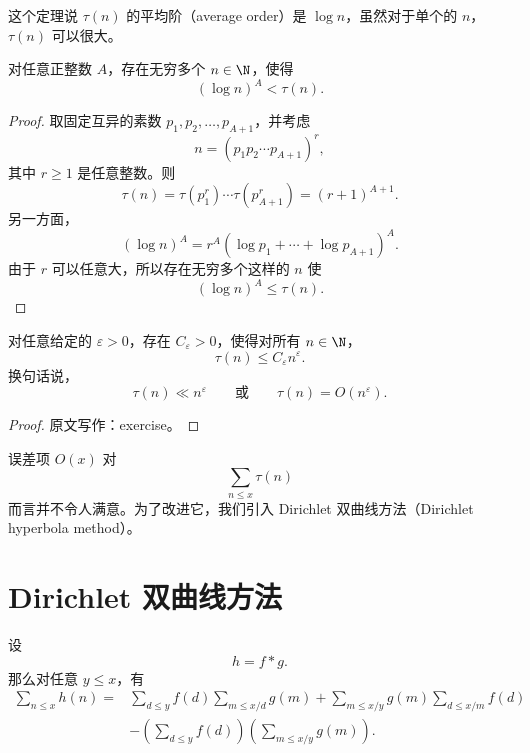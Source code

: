 \begin{remark}
	这个定理说 $\tau(n)$ 的平均阶（average order）是 $\log n$，虽然对于单个的 $n$，$\tau(n)$ 可以很大。
\end{remark}

\begin{proposition}[原文 Proposition 1]
	对任意正整数 $A$，存在无穷多个 $n\in\N$，使得
	\[
		(\log n)^A<\tau(n).
	\]
\end{proposition}

\begin{proof}
	取固定互异的素数 $p_1,p_2,\ldots,p_{A+1}$，并考虑
	\[
		n=(p_1p_2\cdots p_{A+1})^r,
	\]
	其中 $r\geq 1$ 是任意整数。则
	\[
		\tau(n)
		=
		\tau(p_1^r)\cdots \tau(p_{A+1}^r)
		=
		(r+1)^{A+1}.
	\]
	另一方面，
	\[
		(\log n)^A
		=
		r^A(\log p_1+\cdots+\log p_{A+1})^A.
	\]
	由于 $r$ 可以任意大，所以存在无穷多个这样的 $n$ 使
	\[
		(\log n)^A\leq \tau(n).
	\]
\end{proof}

\begin{proposition}[原文 Proposition 2]
	对任意给定的 $\varepsilon>0$，存在 $C_\varepsilon>0$，使得对所有 $n\in\N$，
	\[
		\tau(n)\leq C_\varepsilon n^\varepsilon.
	\]
	换句话说，
	\[
		\tau(n)\ll n^\varepsilon
		\qquad\text{或}\qquad
		\tau(n)=O(n^\varepsilon).
	\]
\end{proposition}

\begin{proof}
	原文写作：exercise。
\end{proof}

误差项 $O(x)$ 对
\[
	\sum_{n\leq x}\tau(n)
\]
而言并不令人满意。为了改进它，我们引入 Dirichlet 双曲线方法（Dirichlet hyperbola method）。

\section{Dirichlet 双曲线方法}


\begin{theorem}
	设
	\[
		h=f*g.
	\]
	那么对任意 $y\leq x$，有
	\[
	\begin{aligned}
		\sum_{n\leq x}h(n)
		={}&
		\sum_{d\leq y}f(d)\sum_{m\leq x/d}g(m)
		+
		\sum_{m\leq x/y}g(m)\sum_{d\leq x/m}f(d) \\
		&-
		\left(\sum_{d\leq y}f(d)\right)
		\left(\sum_{m\leq x/y}g(m)\right).
	\end{aligned}
	\]
\end{theorem}

